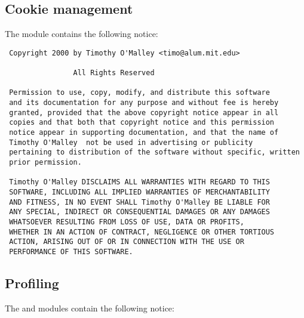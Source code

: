 \subsection{Cookie management}

The  module contains the following notice:

\begin{verbatim}
 Copyright 2000 by Timothy O'Malley <timo@alum.mit.edu>

                All Rights Reserved

 Permission to use, copy, modify, and distribute this software
 and its documentation for any purpose and without fee is hereby
 granted, provided that the above copyright notice appear in all
 copies and that both that copyright notice and this permission
 notice appear in supporting documentation, and that the name of
 Timothy O'Malley  not be used in advertising or publicity
 pertaining to distribution of the software without specific, written
 prior permission.

 Timothy O'Malley DISCLAIMS ALL WARRANTIES WITH REGARD TO THIS
 SOFTWARE, INCLUDING ALL IMPLIED WARRANTIES OF MERCHANTABILITY
 AND FITNESS, IN NO EVENT SHALL Timothy O'Malley BE LIABLE FOR
 ANY SPECIAL, INDIRECT OR CONSEQUENTIAL DAMAGES OR ANY DAMAGES
 WHATSOEVER RESULTING FROM LOSS OF USE, DATA OR PROFITS,
 WHETHER IN AN ACTION OF CONTRACT, NEGLIGENCE OR OTHER TORTIOUS
 ACTION, ARISING OUT OF OR IN CONNECTION WITH THE USE OR
 PERFORMANCE OF THIS SOFTWARE.
\end{verbatim}      



\subsection{Profiling}

The  and  modules contain
the following notice:

